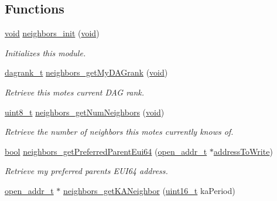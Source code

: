 \subsection*{Functions}
\begin{DoxyCompactItemize}
\item 
\hyperlink{usb__devapi_8h_afabf60e7f57651d6d595a02c75f07cd0}{void} \hyperlink{group___neighbors_ga4e9c73e9e7ec8a90679bed5d18b593a7}{neighbors\+\_\+init} (\hyperlink{usb__devapi_8h_afabf60e7f57651d6d595a02c75f07cd0}{void})
\begin{DoxyCompactList}\small\item\em Initializes this module. \end{DoxyCompactList}\item 
\hyperlink{opendefs_8h_a502861d0bb432f5702761bd854023e21}{dagrank\+\_\+t} \hyperlink{group___neighbors_gab749e7566b80148cd38495cd7bd62272}{neighbors\+\_\+get\+My\+D\+A\+Grank} (\hyperlink{usb__devapi_8h_afabf60e7f57651d6d595a02c75f07cd0}{void})
\begin{DoxyCompactList}\small\item\em Retrieve this mote\textquotesingle{}s current D\+AG rank. \end{DoxyCompactList}\item 
\hyperlink{_p_e___types_8h_aba7bc1797add20fe3efdf37ced1182c5}{uint8\+\_\+t} \hyperlink{group___neighbors_ga07d5dcae3e882a8a9a85997136952fcc}{neighbors\+\_\+get\+Num\+Neighbors} (\hyperlink{usb__devapi_8h_afabf60e7f57651d6d595a02c75f07cd0}{void})
\begin{DoxyCompactList}\small\item\em Retrieve the number of neighbors this mote\textquotesingle{}s currently knows of. \end{DoxyCompactList}\item 
\hyperlink{_p_e___types_8h_a97a80ca1602ebf2303258971a2c938e2}{bool} \hyperlink{group___neighbors_gaaa20cedbb0eb4d6fb9389ccb211a3903}{neighbors\+\_\+get\+Preferred\+Parent\+Eui64} (\hyperlink{structopen__addr__t}{open\+\_\+addr\+\_\+t} $\ast$\hyperlink{samr21__xpro_201bsp__flash_201bsp__flash_8c_a1f7d4f7dc49d64e8ffe1ff2e385657e5}{address\+To\+Write})
\begin{DoxyCompactList}\small\item\em Retrieve my preferred parent\textquotesingle{}s E\+U\+I64 address. \end{DoxyCompactList}\item 
\hyperlink{structopen__addr__t}{open\+\_\+addr\+\_\+t} $\ast$ \hyperlink{group___neighbors_gae741527ad75fcd31a5d7d6fc585174b2}{neighbors\+\_\+get\+K\+A\+Neighbor} (\hyperlink{_p_e___types_8h_a1f1825b69244eb3ad2c7165ddc99c956}{uint16\+\_\+t} ka\+Period)

\end{DoxyCompactItemize}
